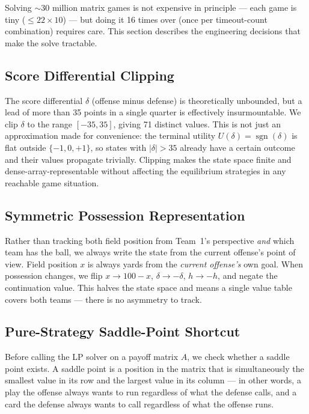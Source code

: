 \documentclass[11pt,letterpaper]{article}
\begin{document}
Solving ${\sim}30$ million matrix games is not expensive in principle --- each game is
tiny (${\leq}22\times10$) --- but doing it 16 times over (once per timeout-count
combination) requires care.  This section describes the engineering decisions that
make the solve tractable.

\subsection{Score Differential Clipping}

The score differential $\delta$ (offense minus defense) is theoretically unbounded,
but a lead of more than 35 points in a single quarter is effectively insurmountable.
We clip $\delta$ to the range $[-35, 35]$, giving 71 distinct values.  This is not
just an approximation made for convenience: the terminal utility $U(\delta) = \operatorname{sgn}(\delta)$
is flat outside $\{-1,0,+1\}$, so states with $|\delta| > 35$ already have a certain
outcome and their values propagate trivially.  Clipping makes the state space finite
and dense-array-representable without affecting the equilibrium strategies in any
reachable game situation.

\subsection{Symmetric Possession Representation}

Rather than tracking both field position from Team~1's perspective \emph{and} which
team has the ball, we always write the state from the current offense's point of view.
Field position $x$ is always yards from the \emph{current offense's} own goal.  When
possession changes, we flip $x \to 100 - x$, $\delta \to -\delta$, $h \to -h$, and
negate the continuation value.  This halves the state space and means a single value
table covers both teams --- there is no asymmetry to track.

\subsection{Pure-Strategy Saddle-Point Shortcut}

Before calling the LP solver on a payoff matrix $A$, we check whether a saddle point
exists.  A saddle point is a position in the matrix that is simultaneously the smallest
value in its row and the largest value in its column --- in other words, a play the
offense always wants to run regardless of what the defense calls, and a card the defense
always wants to call regardless of what the offense runs.
\end{document}

